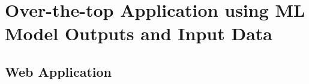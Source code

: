 \section{Over-the-top Application using ML Model Outputs and Input Data}
\subsection{Web Application}